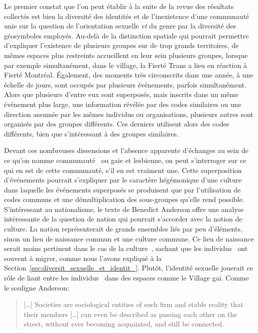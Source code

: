 Le premier constat que l'on peut établir à la suite de la revue des résultats collectés est bien la diversité des identités \lgbt{} et de l'inexistence d'une communauté unie sur la question de l'orientation sexuelle \emph{et} du genre par la diversité des géosymboles employés.
Au-delà de la distinction spatiale qui pourrait permettre d'expliquer l'existence de plusieurs groupes sur de trop grands territoires, de mêmes espaces plus restreints accueillent en leur sein plusieurs groupes, lorsque par exemple simultanément, dans le village, la Fierté Trans a lieu en réaction à Fierté Montréal.
Également, des moments très circonscrits dans une année, à une échelle de jours, sont occupés par plusieurs événements, parfois simultanément.
Alors que plusieurs d'entre eux sont superposés, mais inscrits dans un même événement plus large, une information révélée par des codes similaires ou une direction assumée par les mêmes individus ou organisations, plusieurs autres sont organisés par des groupes différents. 
Ces derniers utilisent alors des codes différents, bien que s'intéressant à des groupes similaires.

Devant ces nombreuses dissensions et l'absence apparente d'échanges au sein de ce qu'on nomme communauté~\lgbt{} ou gaie et lesbienne, on peut s'interroger sur ce qui en est de cette communauté, s'il en est vraiment une.
Cette superposition d'événements pourrait s'expliquer par le caractère hégémonique d'une culture~\lgbt{} dans  laquelle les événements superposés se produisent que par l'utilisation de codes communs et une démultiplication des sous-groupes qu'elle rend possible.
S'intéressant au nationalisme, le texte de Benedict Anderson offre une analyse intéressante de la question de nation qui pourrait s'accorder avec la notion de culture. 
La nation représenterait de grands ensembles liés par peu d'éléments, sinon un lieu de naissance commun et une culture commune.
Ce lieu de naissance serait moins pertinent dans le cas de la culture~\lgbt{}, sachant que les individus~\lgbt{} ont souvent à migrer, comme nous l'avons expliqué à la Section~\ref{sec:diversit_sexuelle_et_identit_}.
Plutôt, l'identité sexuelle jouerait ce rôle de liant entre les individus~\lgbt{} dans des espaces comme le Village gai.
Comme le souligne Anderson:
\begin{quote}
  [\ldots] Societies are sociological entities of such firm and stable reality that their members [\ldots] can even be described as passing each other on the street, without ever becoming acquainted, and still be connected.~\citep[25]{Anderson2006}
\end{quote}

